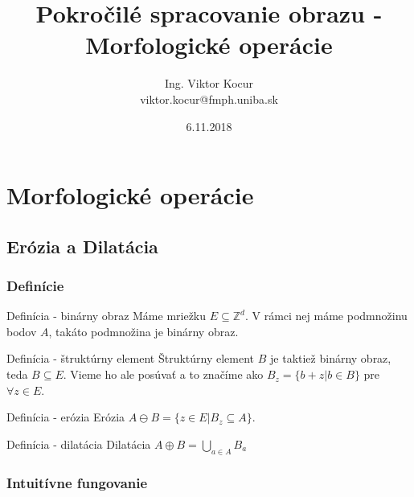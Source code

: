 \documentclass{beamer}
\title[7. cvičenie]{Pokročilé spracovanie obrazu - Morfologické operácie}
\author[Kocur]{Ing. Viktor Kocur \\{\small viktor.kocur@fmph.uniba.sk}}
\institute{DAI FMFI UK}
\date{6.11.2018}
\newcommand*{\Z}{\mathbb{Z}}
\begin{document}

\begin{frame}
  \titlepage
\end{frame}

\section{Morfologické operácie}
\subsection{Erózia a Dilatácia}

\begin{frame}
\frametitle{Definície}
  \begin{block}{Definícia - binárny obraz}
  Máme mriežku $E \subseteq \Z^d$. V rámci nej máme podmnožinu bodov $A$, takáto podmnožina je binárny obraz.
  \end{block}
  
  \begin{block}{Definícia - štruktúrny element}
  Štruktúrny element $B$ je taktiež binárny obraz, teda $B \subseteq E$. Vieme ho ale posúvať a to značíme ako $B_z = \{b + z | b \in B\}$ pre $\forall z \in E$.
  \end{block}

  \begin{block}{Definícia - erózia}
  Erózia $A \ominus B = \{z \in E | B_z \subseteq A \}.$
  \end{block}
  
  \begin{block}{Definícia - dilatácia}
  Dilatácia $A \oplus B = \bigcup_{a \in A} B_a$
  \end{block}
\end{frame}

\begin{frame}
\frametitle{Intuitívne fungovanie} 
\noindent{}
\end{frame}
\end{document}
